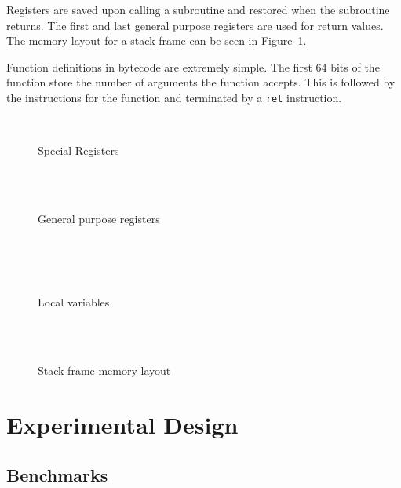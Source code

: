 \documentclass[english,a4paper]{report}
\begin{document}
Registers are saved upon calling a subroutine and restored when the
subroutine returns. The first and last general purpose registers are
used for return values. The memory layout for a stack frame can be
seen in Figure~\ref{fig:stframe}.

Function definitions in bytecode are extremely simple. The first 64
bits of the function store the number of arguments the function
accepts. This is followed by the instructions for the function and
terminated by a \verb|ret| instruction.

\begin{figure}
	\centering
	\begin{bytefield}[bitwidth=0.3em]{64}
		 \\
		\begin{rightwordgroup}{Special Registers}
			  \\
			 \\
		\end{rightwordgroup} \\
		
		\begin{rightwordgroup}{General purpose registers}
			\\
			\\
			\\
		\end{rightwordgroup} \\
		
		\begin{rightwordgroup}{Local variables}
				\\
			 \\[1ex]
		\end{rightwordgroup} \\
	\end{bytefield}
	\caption{Stack frame memory layout}
	\label{fig:stframe}
\end{figure}


\chapter{Experimental Design}

\section{Benchmarks}
\end{document}
